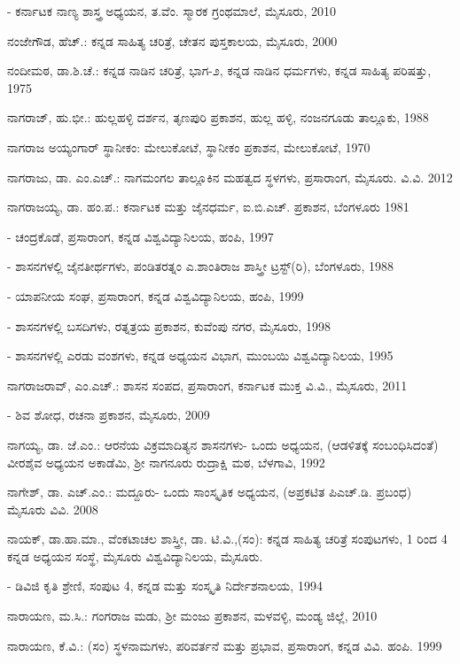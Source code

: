 - ಕರ್ನಾಟಕ ನಾಣ್ಯ ಶಾಸ್ತ್ರ ಅಧ್ಯಯನ, ತ.ವೆಂ. ಸ್ಮಾರಕ ಗ್ರಂಥಮಾಲೆ, ಮೈಸೂರು, 2010

\noindent
ನಂಜೇಗೌಡ, ಹೆಚ್​.: ಕನ್ನಡ ಸಾಹಿತ್ಯ ಚರಿತ್ರೆ, ಚೇತನ ಪುಸ್ತಕಾಲಯ, ಮೈಸೂರು, 2000

\noindent
ನಂದೀಮಠ, ಡಾ.ಶಿ.ಚೆ.: ಕನ್ನಡ ನಾಡಿನ ಚರಿತ್ರೆ, ಭಾಗ-೨, ಕನ್ನಡ ನಾಡಿನ ಧರ್ಮಗಳು, ಕನ್ನಡ ಸಾಹಿತ್ಯ ಪರಿಷತ್ತು, 1975

\noindent
ನಾಗರಾಜ್​, ಹು.ಭೀ.: ಹುಲ್ಲಹಳ್ಳಿ ದರ್ಶನ, ತೃಣಪುರಿ ಪ್ರಕಾಶನ, ಹುಲ್ಲ ಹಳ್ಳಿ, ನಂಜನಗೂಡು ತಾಲ್ಲೂಕು, 1988

\noindent
ನಾಗರಾಜ ಅಯ್ಯಂಗಾರ್​ ಸ್ಥಾನೀಕಂ: ಮೇಲುಕೋಟೆ, ಸ್ಥಾನೀಕಂ ಪ್ರಕಾಶನ, ಮೇಲುಕೋಟೆ, 1970

\noindent
ನಾಗರಾಜು, ಡಾ. ಎಂ.ಎಚ್​.: ನಾಗಮಂಗಲ ತಾಲ್ಲೂಕಿನ ಮಹತ್ವದ ಸ್ಥಳಗಳು, ಪ್ರಸಾರಾಂಗ, ಮೈಸೂರು. ವಿ.ವಿ. 2012

\noindent
ನಾಗರಾಜಯ್ಯ, ಡಾ. ಹಂ.ಪ.: ಕರ್ನಾಟಕ ಮತ್ತು ಜೈನಧರ್ಮ, ಐ.ಬಿ.ಎಚ್​. ಪ್ರಕಾಶನ, ಬೆಂಗಳೂರು 1981

- ಚಂದ್ರಕೊಡೆ, ಪ್ರಸಾರಾಂಗ, ಕನ್ನಡ ವಿಶ್ವವಿದ್ಯಾನಿಲಯ, ಹಂಪಿ, 1997

- ಶಾಸನಗಳಲ್ಲಿ ಜೈನತೀರ್ಥಗಳು, ಪಂಡಿತರತ್ನಂ ಎ.ಶಾಂತಿರಾಜ ಶಾಸ್ತ್ರೀ ಟ್ರಸ್ಟ್​(ರಿ), ಬೆಂಗಳೂರು, 1988

- ಯಾಪನೀಯ ಸಂಘ, ಪ್ರಸಾರಾಂಗ, ಕನ್ನಡ ವಿಶ್ವವಿದ್ಯಾನಿಲಯ, ಹಂಪಿ, 1999

- ಶಾಸನಗಳಲ್ಲಿ ಬಸದಿಗಳು, ರತ್ನತ್ರಯ ಪ್ರಕಾಶನ, ಕುವೆಂಪು ನಗರ, ಮೈಸೂರು, 1998

- ಶಾಸನಗಳಲ್ಲಿ ಎರಡು ವಂಶಗಳು, ಕನ್ನಡ ಅಧ್ಯಯನ ವಿಭಾಗ, ಮುಂಬಯಿ ವಿಶ್ವವಿದ್ಯಾನಿಲಯ, 1995

\noindent
ನಾಗರಾಜರಾವ್​, ಎಂ.ಎಚ್​.: ಶಾಸನ ಸಂಪದ, ಪ್ರಸಾರಾಂಗ, ಕರ್ನಾಟಕ ಮುಕ್ತ ವಿ.ವಿ., ಮೈಸೂರು, 2011

- ಶಿವ ಶೋಧ, ರಚನಾ ಪ್ರಕಾಶನ, ಮೈಸೂರು, 2009

\noindent
ನಾಗಯ್ಯ, ಡಾ. ಜೆ.ಎಂ.: ಆರನೆಯ ವಿಕ್ರಮಾದಿತ್ಯನ ಶಾಸನಗಳು- ಒಂದು ಅಧ್ಯಯನ, (ಆಡಳಿತಕ್ಕೆ ಸಂಬಂಧಿಸಿದಂತೆ) ವೀರಶೈವ ಅಧ್ಯಯನ ಅಕಾಡೆಮಿ, ಶ‍್ರೀ ನಾಗನೂರು ರುದ್ರಾಕ್ಷಿ ಮಠ, ಬೆಳಗಾವಿ, 1992

\noindent
ನಾಗೇಶ್​, ಡಾ. ಎಚ್​.ಎಂ.: ಮದ್ದೂರು- ಒಂದು ಸಾಂಸ್ಕೃತಿಕ ಅಧ್ಯಯನ, (ಅಪ್ರಕಟಿತ ಪಿಎಚ್​.ಡಿ. ಪ್ರಬಂಧ) ಮೈಸೂರು ವಿವಿ. 2008

\noindent
ನಾಯಕ್​, ಡಾ.ಹಾ.ಮಾ., ವೆಂಕಟಾಚಲ ಶಾಸ್ತ್ರೀ, ಡಾ. ಟಿ.ವಿ.,(ಸಂ): ಕನ್ನಡ ಸಾಹಿತ್ಯ ಚರಿತ್ರೆ ಸಂಪುಟಗಳು, 1 ರಿಂದ 4 ಕನ್ನಡ ಅಧ್ಯಯನ ಸಂಸ್ಥೆ, ಮೈಸೂರು ವಿಶ್ವವಿದ್ಯಾನಿಲಯ, ಮೈಸೂರು.

- ಡಿವಿಜಿ ಕೃತಿ ಶ್ರೇಣಿ, ಸಂಪುಟ 4, ಕನ್ನಡ ಮತ್ತು ಸಂಸ್ಕೃತಿ ನಿರ್ದೇಶನಾಲಯ, 1994

\noindent
ನಾರಾಯಣ, ಮ.ಸಿ.: ಗಂಗರಾಜ ಮಡು, ಶ‍್ರೀ ಮಂಜು ಪ್ರಕಾಶನ, ಮಳವಳ್ಳಿ, ಮಂಡ್ಯ ಜಿಲ್ಲೆ, 2010

\noindent
ನಾರಾಯಣ, ಕೆ.ವಿ.: (ಸಂ) ಸ್ಥಳನಾಮಗಳು, ಪರಿವರ್ತನೆ ಮತ್ತು ಪ್ರಭಾವ, ಪ್ರಸಾರಾಂಗ, ಕನ್ನಡ ವಿವಿ. ಹಂಪಿ. 1999

